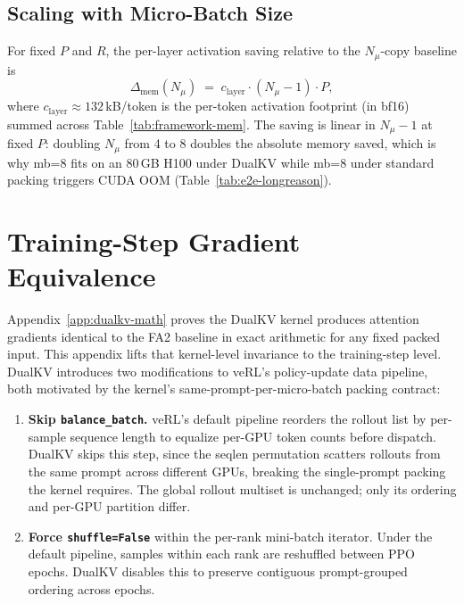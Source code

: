 \documentclass{article}
\begin{document}
\subsection{Scaling with Micro-Batch Size}

For fixed $P$ and $R$, the per-layer activation saving relative to the $N_\mu$-copy baseline is
\begin{equation}
  \Delta_{\text{mem}}(N_\mu) \;=\; c_{\text{layer}} \cdot (N_\mu - 1) \cdot P,
\end{equation}
where $c_{\text{layer}} \approx 132$\,kB/token is the per-token activation footprint (in bf16) summed across Table~\ref{tab:framework-mem}. The saving is linear in $N_\mu - 1$ at fixed $P$: doubling $N_\mu$ from 4 to 8 doubles the absolute memory saved, which is why mb=8 fits on an 80\,GB H100 under DualKV while mb=8 under standard packing triggers CUDA OOM (Table~\ref{tab:e2e-longreason}).
\fi

\section{Training-Step Gradient Equivalence}
\label{app:pipeline-invariance}

Appendix~\ref{app:dualkv-math} proves the DualKV kernel produces attention gradients identical to the FA2 baseline in exact arithmetic for any fixed packed input. This appendix lifts that kernel-level invariance to the training-step level. DualKV introduces two modifications to veRL's policy-update data pipeline, both motivated by the kernel's same-prompt-per-micro-batch packing contract:
\begin{enumerate}
  \item \textbf{Skip \texttt{balance\_batch}.} veRL's default pipeline reorders the rollout list by per-sample sequence length to equalize per-GPU token counts before dispatch. DualKV skips this step, since the seqlen permutation scatters rollouts from the same prompt across different GPUs, breaking the single-prompt packing the kernel requires. The global rollout multiset is unchanged; only its ordering and per-GPU partition differ.
  \item \textbf{Force \texttt{shuffle=False}} within the per-rank mini-batch iterator. Under the default pipeline, samples within each rank are reshuffled between PPO epochs. DualKV disables this to preserve contiguous prompt-grouped ordering across epochs.
\end{enumerate}
\end{document}
